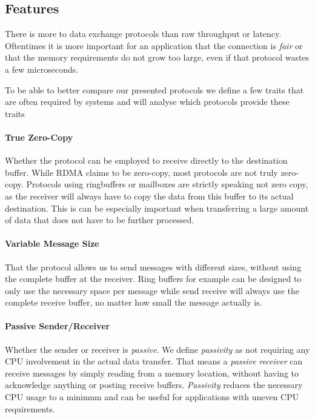 \pagebreak

\subsection{Features}

There is more to data exchange protocols than raw throughput or latency. Oftentimes it is more important for an application
that the connection is \emph{fair} or that the memory requirements do not grow too large, even if that protocol wastes
a few microseconds.

To be able to better compare our presented protocols we define a few traits that are often required by systems and will 
analyse which protocols provide these traits

\paragraph{True Zero-Copy} Whether the protocol can be employed to receive directly to the destination buffer. While RDMA 
claims to be zero-copy, most protocols are not truly zero-copy. Protocols using ringbuffers or mailboxes are
strictly speaking not zero copy, as the receiver will always have to copy the data from this buffer to its actual destination.
This is can be especially important when transferring a large amount of data that does not have to be further processed.

\paragraph{Variable Message Size} That the protocol allows us to send messages with different sizes, without using the 
complete buffer at the receiver. Ring buffers for example can be designed to only use the necessary space per message
while send receive will always use the complete receive buffer, no matter how small the message actually is.

\paragraph{Passive Sender/Receiver} Whether the sender or receiver is \emph{passive}. We define \emph{passivity} as not 
requiring any CPU involvement in the actual data transfer. That means a \emph{passive receiver} can receive messages by
simply reading from a memory location, without having to acknowledge anything or posting receive buffers. \emph{Passivity} 
reduces the necessary CPU usage to a minimum and can be useful for applications with uneven CPU requirements.

